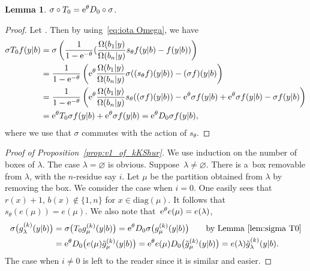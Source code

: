 \documentclass[pdftex]{sigma}
\numberwithin{equation}{section}
\newcommand{\la}{\lambda}
\newcommand{\Rep}{{R(T)}}
\newtheorem{Lemma}[Theorem]{Lemma}
\theoremstyle{definition}
\begin{document}
\begin{Lemma}\label{lem:sigma T0}
$\sigma \circ T_0={\rm e}^{\theta} D_0 \circ \sigma$.
\end{Lemma}
\begin{proof}
Let \smash{$f(y|b)\in \hat{\Lambda}^\Rep$}. Then
by using~\eqref{eq:iota Omega}, we have
\begin{align*}
\sigma T_0 f(y|b)
&=\sigma
\left(
\frac{1}{1-{\rm e}^{-\theta}}(\frac{\Omega(b_1|y)}{\Omega(b_n|y)}s_\theta f(y|b) -f(y|b))
\right)\\
&=
\frac{1}{1-{\rm e}^{-\theta}}\left({\rm e}^{\theta}\frac{\Omega(b_1|y)}{\Omega(b_n|y)} \sigma(( s_\theta f)(y| b)) -(\sigma f)(y|b)\right)\\
&=
\frac{1}{1-{\rm e}^{-\theta}}\left({\rm e}^{\theta}\frac{\Omega(b_1|y)}{\Omega(b_n|y)}s_\theta(( \sigma f)(y| b))-{\rm e}^{\theta} \sigma f(y| b) +{\rm e}^{\theta}\sigma f(y| b)-\sigma f(y|b)\right)\\
&={\rm e}^{\theta}
T_0\sigma f(y|b)
+{\rm e}^{\theta}\sigma f(y|b)={\rm e}^{\theta}
D_0\sigma f(y|b),
\end{align*}
where we use that $\sigma$ commutes with the action of $s_\theta$.
\end{proof}

\begin{proof}[Proof of Proposition~\ref{prop:v1_of_kKShur}]
We use induction on the number of boxes of $\la$. The case $\la=\varnothing$ is
obvious. Suppose~${\la\ne \varnothing}$.
There is a~box removable from $\la$, with the $n$-residue say $i$. Let $\mu$ be the partition obtained from $\la$ by removing the box.
We consider the case when $i=0$.
One easily sees that~${r(x)+1}$, $b(x)\notin\{1,n\}$ for $x\in \mathrm{diag}(\mu)$. It follows that $s_\theta (e(\mu))=e(\mu)$. We also note that~${{\rm e}^\theta e(\mu)=e(\lambda)}$,
\begin{align*}
\sigma\bigl(g^{(k)}_\lambda(y|b)\bigr)
&=\sigma\bigl(T_0 g^{(k)}_\mu(y|b)\bigr)={\rm e}^{\theta}{D}_0\sigma\bigl( g^{(k)}_\mu(y|b)\bigr)\qquad \text{by Lemma~\ref{lem:sigma T0}}\\
&={\rm e}^{\theta}{D}_0\bigl(e(\mu)\tilde{g}^{(k)}_\mu(y|b)\bigr)={\rm e}^{\theta}e(\mu){D}_0\bigl(\tilde{g}^{(k)}_\mu(y|b)\bigr)
=e(\lambda)\tilde{g}^{(k)}_\lambda(y|b).
\end{align*}
The case when $i\ne 0$ is
left to the reader since it is
similar and easier.
\end{proof}
\end{document}
